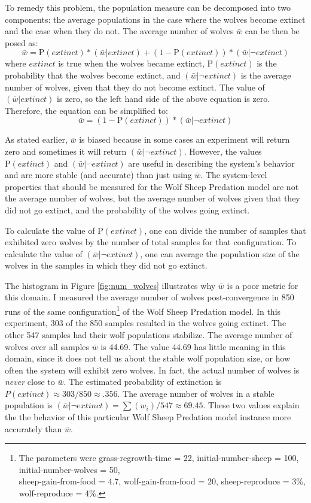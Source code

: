 To remedy this problem, the population measure can be decomposed into two components: the average populations in the case where the wolves become extinct and the case when they do not.
The average number of wolves $\bar w$ can be then be posed as:
\[\bar w = \mathrm{P}(extinct) * (\bar w | extinct) + (1 - \mathrm{P}(extinct)) * (\bar w | \neg extinct) \]
where $extinct$ is true when the wolves became extinct, $\mathrm{P}(extinct)$ is the probability that the wolves become extinct, and $(\bar w | \neg extinct)$ is the average number of wolves, given that they do not become extinct.
The value of $(\bar w | extinct)$ is zero, so the left hand side of the above equation is zero.
Therefore, the equation can be simplified to:
\[\bar w = (1 - \mathrm{P}(extinct)) * (\bar w | \neg extinct) \]

As stated earlier, $\bar w$ is biased because in some cases an experiment will return zero and sometimes it will return $(\bar w | \neg extinct)$.
However, the values $\mathrm{P}(extinct)$ and $(\bar  w | \neg extinct)$ are useful in describing the system's behavior and are more stable (and accurate) than just using $\bar w$.
The system-level properties that should be measured for the Wolf Sheep Predation model are not the average number of wolves, but the average number of wolves given that they did not go extinct, and the probability of the wolves going extinct.

To calculate the value of $\mathrm{P}(extinct)$, one can divide the number of samples that exhibited zero wolves by the number of total samples for that configuration.
To calculate the value of $(\bar w | \neg extinct)$, one can average the population size of the wolves in the samples in which they did not go extinct.

The histogram in Figure \ref{fig:num_wolves} illustrates why $\bar w$ is a poor metric for this domain.
I measured the average number of wolves post-convergence in 850 runs of the same configuration\footnote{The parameters were grass-regrowth-time = 22, initial-number-sheep = 100, initial-number-wolves = 50, \\
sheep-gain-from-food = 4.7, wolf-gain-from-food = 20, sheep-reproduce = 3\%, wolf-reproduce = 4\%. } of the Wolf Sheep Predation model.
In this experiment, 303 of the 850 samples resulted in the wolves going extinct.
The other 547 samples had their wolf populations stabilize.
The average number of wolves over all samples $\bar w$ is 44.69.
The value 44.69 has little meaning in this domain, since it does not tell us about the stable wolf population size, or how often the system will exhibit zero wolves.
In fact, the actual number of wolves is \textit{never} close to $\bar w$.
The estimated probability of extinction is $P(extinct) \approx 303 / 850 \approx .356$.
The average number of wolves in a stable population is $(\bar w | \neg extinct) = \sum (w_i) / 547 \approx 69.45$.
These two values explain the the behavior of this particular Wolf Sheep Predation model instance more accurately than $\bar w$.

